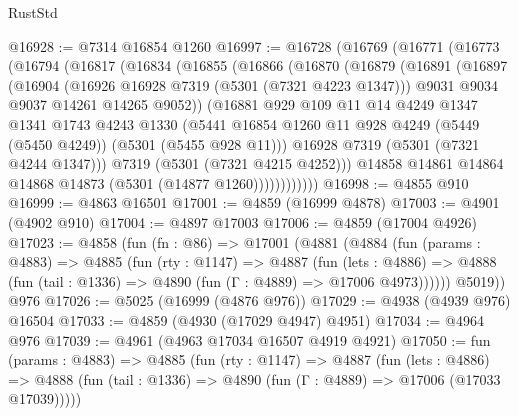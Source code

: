 \begin{lexlean}{RustStd}
\begin{coremodule}
@16928 := @7314 @16854 @1260
@16997 := @16728
    (@16769
      (@16771
        (@16773
          (@16794
            (@16817
              (@16834
                (@16855
                  (@16866
                    (@16870
                      (@16879
                        (@16891
                          (@16897
                            (@16904
                              (@16926 @16928 @7319 (@5301 (@7321 @4223 @1347)))
                              @9031
                              @9034
                              @9037
                              @14261
                              @14265
                              @9052))
                          (@16881
                            @929
                            @109
                            @11
                            @14
                            @4249
                            @1347
                            @1341
                            @1743
                            @4243
                            @1330
                            (@5441
                              @16854
                              @1260
                              @11
                              @928
                              @4249
                              (@5449 (@5450 @4249))
                              (@5301 (@5455 @928 @11)))
                            @16928
                            @7319
                            (@5301 (@7321 @4244 @1347)))
                          @7319
                          (@5301 (@7321 @4215 @4252)))
                        @14858
                        @14861
                        @14864
                        @14868
                        @14873
                        (@5301 (@14877 @1260))))))))))))
@16998 := @4855 @910
@16999 := @4863 @16501
@17001 := @4859 (@16999 @4878)
@17003 := @4901 (@4902 @910)
@17004 := @4897 @17003
@17006 := @4859 (@17004 @4926)
@17023 := @4858
    (fun (fn : @86) =>
    @17001
      (@4881
        (@4884
          (fun (params : @4883) =>
          @4885
            (fun (rty : @1147) =>
            @4887
              (fun (lets : @4886) =>
              @4888 (fun (tail : @1336) => @4890 (fun (Γ : @4889) => @17006 @4973))))))
        @5019))
    @976
@17026 := @5025 (@16999 (@4876 @976))
@17029 := @4938 (@4939 @976) @16504
@17033 := @4859 (@4930 (@17029 @4947) @4951)
@17034 := @4964 @976
@17039 := @4961 (@4963 @17034 @16507 @4919 @4921)
@17050 := fun (params : @4883) =>
  @4885
    (fun (rty : @1147) =>
    @4887
      (fun (lets : @4886) =>
      @4888 (fun (tail : @1336) => @4890 (fun (Γ : @4889) => @17006 (@17033 @17039)))))

\end{coremodule}
\end{lexlean}
